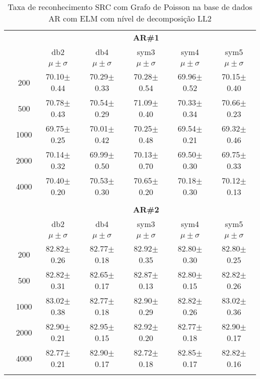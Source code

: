 \begin{table}[H]
	\centering
    \normalsize
	\caption{Taxa de reconhecimento SRC com Grafo de Poisson na base de dados AR com ELM com nível de decomposição LL2}
		\begin{tabular}{|c|c|c c c c c|}
\cline{3-7}
\multicolumn{2}{c|}{\multirow{3}{*}{}} & \multicolumn{5}{c|}{\textbf{AR\#1}}   \\\cline{3-7} 
\multicolumn{2}{c|}{}  & db2 & db4 & sym3 & sym4 & sym5 \\\cline{3-7}%
\multicolumn{2}{c|}{}& $\mu \pm \sigma$ & $\mu \pm \sigma$ & $\mu \pm \sigma$ & $\mu \pm \sigma$ & $\mu \pm \sigma$ \\\hline


\multicolumn{1}{|c|}{ \multirow{5}{*}{\rotatebox[origin=c]{90}{\textbf{Neurônios}}} }
&200	&70.10$\pm$0.44	&70.29$\pm$0.33	&70.28$\pm$0.54	&69.96$\pm$0.52	&70.15$\pm$0.40\\\cline{2-7}
&500	&70.78$\pm$0.43	&70.54$\pm$0.29	&71.09$\pm$0.40	&70.33$\pm$0.34	&70.66$\pm$0.23\\\cline{2-7}
&1000	&69.75$\pm$0.25	&70.01$\pm$0.42	&70.25$\pm$0.48	&69.54$\pm$0.21	&69.32$\pm$0.46\\\cline{2-7}
&2000	&70.14$\pm$0.32	&69.99$\pm$0.50	&70.13$\pm$0.70	&69.50$\pm$0.30	&69.75$\pm$0.33\\\cline{2-7}
&4000	&70.40$\pm$0.20	&70.53$\pm$0.30	&70.65$\pm$0.20	&70.18$\pm$0.30	&70.12$\pm$0.13
	

\\ \midrule
\multicolumn{7}{c}{}\\ 


\cline{3-7}
\multicolumn{2}{c|}{\multirow{3}{*}{}} & \multicolumn{5}{c|}{\textbf{AR\#2}}   \\\cline{3-7} 
\multicolumn{2}{c|}{}  & db2 & db4 & sym3 & sym4 & sym5 \\\cline{3-7}%
\multicolumn{2}{c|}{}& $\mu \pm \sigma$ & $\mu \pm \sigma$ & $\mu \pm \sigma$ & $\mu \pm \sigma$ & $\mu \pm \sigma$ \\\hline

\multicolumn{1}{|c|}{ \multirow{5}{*}{\rotatebox[origin=c]{90}{\textbf{Neurônios}}} }
&200	&82.82$\pm$0.26	&82.77$\pm$0.18	&82.92$\pm$0.35	&82.80$\pm$0.30	&82.80$\pm$0.25\\\cline{2-7}
&500	&82.82$\pm$0.31	&82.65$\pm$0.17	&82.87$\pm$0.13	&82.80$\pm$0.15	&82.82$\pm$0.26\\\cline{2-7}
&1000	&83.02$\pm$0.38	&82.77$\pm$0.18	&82.90$\pm$0.29	&82.82$\pm$0.26	&83.02$\pm$0.36\\\cline{2-7}
&2000	&82.90$\pm$0.21	&82.95$\pm$0.15	&82.92$\pm$0.20	&82.77$\pm$0.18	&82.90$\pm$0.17\\\cline{2-7}
&4000	&82.77$\pm$0.21	&82.90$\pm$0.17	&82.72$\pm$0.18	&82.85$\pm$0.17	&82.82$\pm$0.16
\\ \midrule
\multicolumn{7}{c}{}\\ 



\end{tabular}
\end{table}
